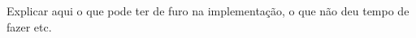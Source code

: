 \documentclass[twoside,english,brazilian]{UNISINOSartigo}
\begin{document}
Explicar aqui o que pode ter de furo na implementação, o que não deu tempo de fazer etc.




\end{document}
